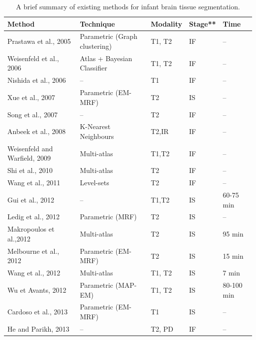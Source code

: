 \documentclass[twoside,espcrc2]{elsarticle}
\begin{document}
\begin{table}[h!]
\begin{center}
\begin{scriptsize}
\centering
\renewcommand{\arraystretch}{1.25}
\caption{A brief summary of existing methods for infant brain tissue segmentation.}
\label{table:table_RV_seg}
\begin{tabular}{lC{38mm}C{15mm}C{15mm}C{15mm}}
\toprule
\textbf{Method} & \textbf{Technique} & \textbf{Modality} & \textbf{Stage}** & \textbf{Time}
 \\
 \midrule\midrule
Prastawa et al., 2005 \cite{prastawa2005automatic} & Parametric (Graph clustering) & T1, T2 & IF & -- \\  
Weisenfeld et al., 2006 \cite{weisenfeld2006segmentation} & Atlas + Bayesian Classifier & T1, T2 & IF &  --\\ 
Nishida et al., 2006 \cite{nishida2006detailed} & -- & T1 & IF & --\\
Xue et al., 2007 \cite{xue2007automatic} & Parametric (EM-MRF) & T2 & IS & -- \\
Song et al., 2007 \cite{song2007clinical} & -- & T2 & IF & --\\
Anbeek et al., 2008 \cite{anbeek2008probabilistic} & K-Nearest Neighbours& T2,IR & IF & --\\
Weisenfeld and Warfield, 2009 \cite{weisenfeld2009automatic} & Multi-atlas & T1,T2 & IF & --\\
Shi et al., 2010 \cite{shi2010construction} & Multi-atlas & T2 & IF & -- \\
Wang et al., 2011 \cite{wang2011automatic} & Level-sets & T2 & IF & --\\
Gui et al., 2012 \cite{gui2012morphology} & -- & T1,T2 & IS & 60-75 min\\
Ledig et al., 2012 \cite{ledig2012neonatal} & Parametric (MRF) & T2 & IS & --\\
Makropoulos et al.,2012 \cite{makropoulos2012automatic} & Multi-atlas & T2 &  IS & 95 min\\
Melbourne et al., 2012 \cite{melbourne2012neobrains12} & Parametric (EM-MRF)  & T2 & IS & 15 min\\
Wang et al., 2012 \cite{wang2012atlas} & Multi-atlas & T1, T2 & IS & 7 min\\
Wu et Avants, 2012 \cite{wu2012automatic} & Parametric (MAP-EM) & T1, T2 & IS & 80-100 min\\
Cardoso et al., 2013 \cite{cardoso2013adapt} & Parametric (EM-MRF) & T1 & IS  & --\\
He and Parikh, 2013 \cite{he2013automated} & -- & T2, PD & IF & -- \\

\end{tabular}
\end{scriptsize}
\end{center}
\end{table}
\end{document}

